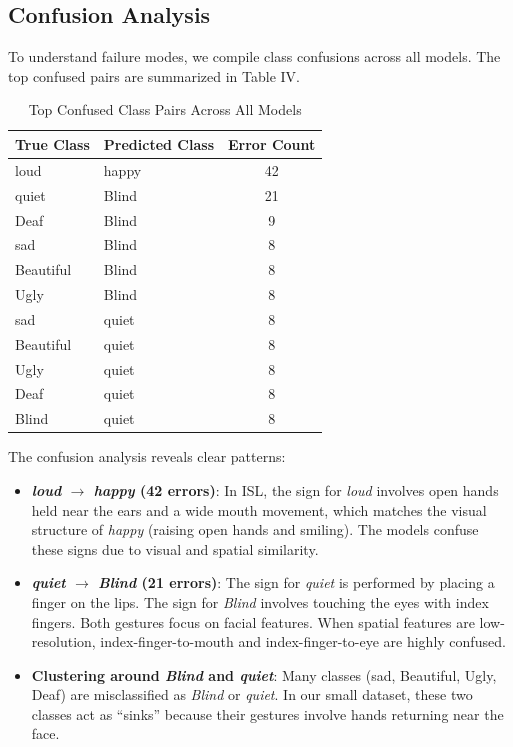 \documentclass[conference]{IEEEtran}
\begin{document}
\begin{table}[t]
\subsection{Confusion Analysis}
To understand failure modes, we compile class confusions across all models. The top confused pairs are summarized in Table IV.

\begin{table}[h]
\centering
\caption{Top Confused Class Pairs Across All Models}
\begin{tabular}{llc}
\toprule
\textbf{True Class} & \textbf{Predicted Class} & \textbf{Error Count} \\
\midrule
loud & happy & 42 \\
quiet & Blind & 21 \\
Deaf & Blind & 9 \\
sad & Blind & 8 \\
Beautiful & Blind & 8 \\
Ugly & Blind & 8 \\
sad & quiet & 8 \\
Beautiful & quiet & 8 \\
Ugly & quiet & 8 \\
Deaf & quiet & 8 \\
Blind & quiet & 8 \\
\bottomrule
\end{tabular}
\label{tab:confusion}
\end{table}

The confusion analysis reveals clear patterns:
\begin{itemize}
    \item \textbf{\textit{loud} $\rightarrow$ \textit{happy} (42 errors)}: In ISL, the sign for \textit{loud} involves open hands held near the ears and a wide mouth movement, which matches the visual structure of \textit{happy} (raising open hands and smiling). The models confuse these signs due to visual and spatial similarity.
    \item \textbf{\textit{quiet} $\rightarrow$ \textit{Blind} (21 errors)}: The sign for \textit{quiet} is performed by placing a finger on the lips. The sign for \textit{Blind} involves touching the eyes with index fingers. Both gestures focus on facial features. When spatial features are low-resolution, index-finger-to-mouth and index-finger-to-eye are highly confused.
    \item \textbf{Clustering around \textit{Blind} and \textit{quiet}}: Many classes (sad, Beautiful, Ugly, Deaf) are misclassified as \textit{Blind} or \textit{quiet}. In our small dataset, these two classes act as ``sinks'' because their gestures involve hands returning near the face.
\end{itemize}


\end{table}
\end{document}
